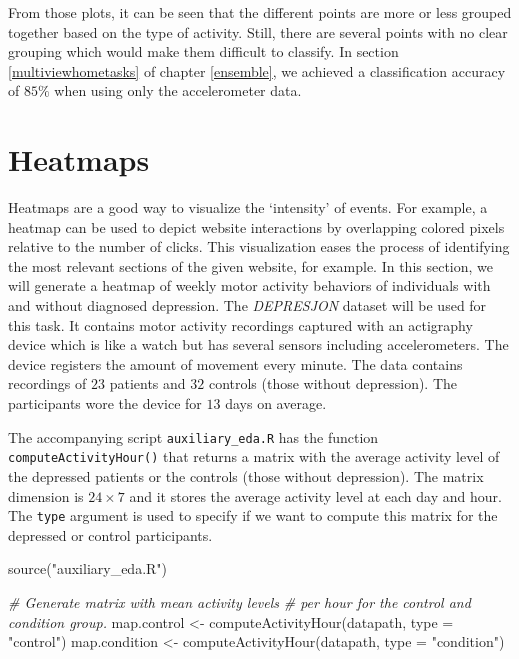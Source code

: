 \documentclass[
  11pt,
]{krantz}
\newenvironment{Shaded}{\begin{snugshade}}{\end{snugshade}}
\newcommand{\AttributeTok}[1]{\textcolor[rgb]{0.61,0.61,0.61}{#1}}
\newcommand{\CommentTok}[1]{\textcolor[rgb]{0.37,0.37,0.37}{\textit{#1}}}
\newcommand{\FunctionTok}[1]{\textcolor[rgb]{0,0,0}{#1}}
\newcommand{\NormalTok}[1]{#1}
\newcommand{\OtherTok}[1]{\textcolor[rgb]{0.37,0.37,0.37}{#1}}
\newcommand{\StringTok}[1]{\textcolor[rgb]{0.5,0.5,0.5}{#1}}
\begin{document}
From those plots, it can be seen that the different points are more or less grouped together based on the type of activity. Still, there are several points with no clear grouping which would make them difficult to classify. In section \ref{multiviewhometasks} of chapter \ref{ensemble}, we achieved a classification accuracy of \(85\%\) when using only the accelerometer data.

\hypertarget{heatmaps}{%
\section{Heatmaps}\label{heatmaps}}

Heatmaps are a good way to visualize the `intensity' of events. For example, a heatmap can be used to depict website interactions by overlapping colored pixels relative to the number of clicks. This visualization eases the process of identifying the most relevant sections of the given website, for example. In this section, we will generate a heatmap of weekly motor activity behaviors of individuals with and without diagnosed depression. The \emph{DEPRESJON} dataset will be used for this task. It contains motor activity recordings captured with an actigraphy device which is like a watch but has several sensors including accelerometers. The device registers the amount of movement every minute. The data contains recordings of \(23\) patients and \(32\) controls (those without depression). The participants wore the device for \(13\) days on average.

The accompanying script \texttt{auxiliary\_eda.R} has the function \texttt{computeActivityHour()} that returns a matrix with the average activity level of the depressed patients or the controls (those without depression). The matrix dimension is \(24\times7\) and it stores the average activity level at each day and hour. The \texttt{type} argument is used to specify if we want to compute this matrix for the depressed or control participants.

\begin{Shaded}
\begin{Highlighting}[]
\FunctionTok{source}\NormalTok{(}\StringTok{"auxiliary\_eda.R"}\NormalTok{)}

\CommentTok{\# Generate matrix with mean activity levels}
\CommentTok{\# per hour for the control and condition group.}
\NormalTok{map.control }\OtherTok{\textless{}{-}} \FunctionTok{computeActivityHour}\NormalTok{(datapath, }\AttributeTok{type =} \StringTok{"control"}\NormalTok{)}
\NormalTok{map.condition }\OtherTok{\textless{}{-}} \FunctionTok{computeActivityHour}\NormalTok{(datapath, }\AttributeTok{type =} \StringTok{"condition"}\NormalTok{)}
\end{Highlighting}
\end{Shaded}
\end{document}
